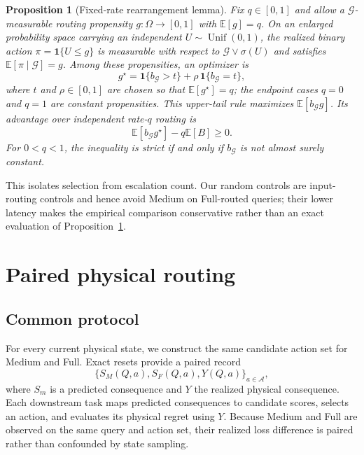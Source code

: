 \documentclass[10pt]{article}
\newtheorem{proposition}{Proposition}
\theoremstyle{definition}
\theoremstyle{remark}
\newcommand{\E}{\mathbb{E}}
\newcommand{\G}{\mathcal{G}}
\begin{document}
\begin{proposition}[Fixed-rate rearrangement lemma]
\label{prop:matched}
Fix $q\in[0,1]$ and allow a $\G$-measurable routing propensity
$g:\Omega\to[0,1]$ with $\E[g]=q$.  On an enlarged probability space
carrying an independent $U\sim\operatorname{Unif}(0,1)$, the realized binary
action $\pi=\mathbf 1\{U\le g\}$ is measurable with respect to
$\G\vee\sigma(U)$ and satisfies $\E[\pi\mid\G]=g$.  Among these propensities, an optimizer is
\[
 g^\star=\mathbf 1\{b_{\G}>t\}
 +\rho\,\mathbf 1\{b_{\G}=t\},
\]
where $t$ and $\rho\in[0,1]$ are chosen so that $\E[g^\star]=q$; the
endpoint cases $q=0$ and $q=1$ are constant propensities.  This upper-tail rule
maximizes $\E[b_{\G}g]$.  Its advantage over independent rate-$q$ routing is
\[
 \E[b_{\G}g^\star]-q\E[B]\ge0.
\]
For $0<q<1$, the inequality is strict if and only if $b_{\G}$ is not almost
surely constant.
\end{proposition}

This isolates selection from escalation count.  Our random controls are
input-routing controls and hence avoid Medium on Full-routed queries; their
lower latency makes the empirical comparison conservative rather than an
exact evaluation of Proposition~\ref{prop:matched}.

\begin{table}[t]
\centering
\caption{Theory-to-evidence map.  The algebra organizes the experiment; the
new evidence lies in paired protocols and frozen audit comparisons.}
\label{tab:theorymap}
\small

\end{table}

\section{Paired physical routing}
\label{sec:method}

\subsection{Common protocol}

For every current physical state, we construct the same candidate action set
for Medium and Full.  Exact resets provide a paired record
\[
 \bigl\{
   S_M(Q,a),S_F(Q,a),Y(Q,a)
 \bigr\}_{a\in\mathcal A},
\]
where $S_m$ is a predicted consequence and $Y$ the realized physical
consequence.  Each downstream task maps predicted consequences to candidate
scores, selects an action, and evaluates its physical regret using $Y$.
Because Medium and Full are observed on the same query and action set, their
realized loss difference is paired rather than confounded by state sampling.
\end{document}

